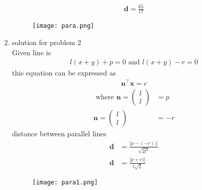 \documentclass[12pt]{article}
\newcommand{\myvec}[1]{\ensuremath{\begin{pmatrix}#1\end{pmatrix}}}
\let\vec\mathbf
\begin{document}
\begin{enumerate}
\begin{align}
	\vec{d}=\frac{65}{17}
\end{align}
\begin{figure}[h!]
\begin{center}
\texttt{[image: para.png]}
\end{center}
\caption{}
\label{fig:Fig1}
\end{figure}
	\item solution for problem 2
	\\
Given line is 
\begin{align}
l(x+y)+p=0\text{ and }l(x+y)-r=0
\end{align}
this equation can be expressed as 
\begin{align}
	\vec{n}^{\top}\vec{x}=c
\end{align}
\begin{align}
\text{ where }
		\vec{n} = \myvec{l\\l}&=p\\
		\vec{n} = \myvec{l\\l}&=-r
\end{align}
distance between parallel lines 
\begin{align}
\vec{d}&=\frac{\left|p-(-r))\right|}{\sqrt{2l^{2}}}\\
\vec{d}&=\frac{\left|p+r)\right|}{l\sqrt{2}}
\end{align}
		
\begin{figure}[h!]
\begin{center}
\texttt{[image: para1.png]}
\end{center}
\caption{}
\label{fig:Fig2}
\end{figure}
\end{enumerate}
\end{document}
